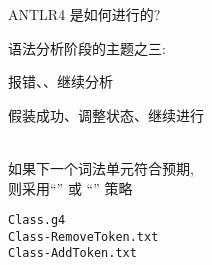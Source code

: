 
\begin{frame}{}
  \begin{center}
    \Large{ANTLR4 是如何进行的?}
  \end{center}
\end{frame}

\begin{frame}{}
  \begin{center}
    语法分析阶段的主题之三: 


    报错、、继续分析
  \end{center}
\end{frame}

\begin{frame}{}

  \vspace{0.30cm}
  \begin{center}
     假装成功、调整状态、继续进行
  \end{center}
\end{frame}

\begin{frame}{}
\end{frame}

\begin{frame}{}
  \begin{center}
    \texttt{\bf {}} \\[20pt]

    \pause
    如果下一个词法单元符合预期, \\[5pt]
    则采用``'' 或 ``'' 策略

    \pause
    \vspace{1.00cm}
    \texttt{Class.g4} \\[15pt]
    \texttt{Class-RemoveToken.txt} \\[10pt]
    \texttt{Class-AddToken.txt} \\[10pt]
  \end{center}
\end{frame}

